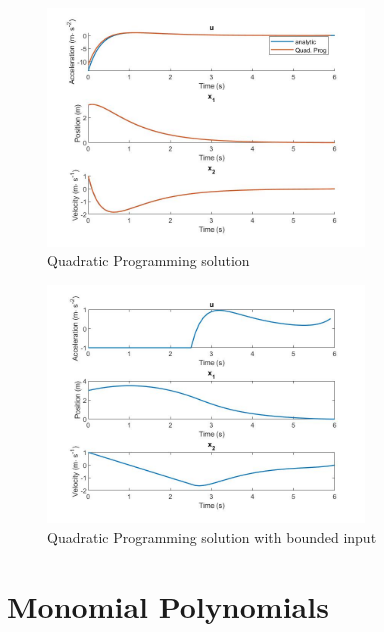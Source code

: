 \begin{figure}[h!]
\centering
\includegraphics[width=0.75\textwidth]{Images/quad_prog_unconstrained.jpg}
\caption{Quadratic Programming solution}
\label{fig:solution_quad_prog_un}
\end{figure}


\begin{figure}[h!]
\centering
\includegraphics[width=0.75\textwidth]{Images/quad_prog_constrained.jpg}
\caption{Quadratic Programming solution with bounded input}
\label{fig:solution_quad_prog_con}
\end{figure}


\section{Monomial Polynomials}

